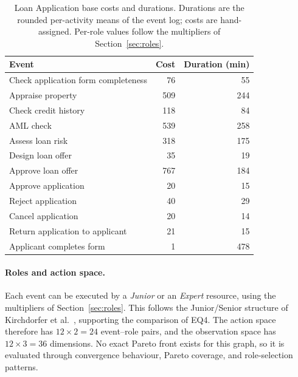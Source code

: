 \begin{table}[H]
\centering
\renewcommand{\arraystretch}{1.5}
\setlength{\tabcolsep}{16pt}
\caption{Loan Application base costs and durations. Durations are the
         rounded per-activity means of the event log; costs are
         hand-assigned. Per-role values follow the multipliers of
         Section~\ref{sec:roles}.}
\label{tab:loan_costs}
\begin{tabular}{lrr}
\toprule
\textbf{Event} & \textbf{Cost} & \textbf{Duration (min)} \\
\midrule
Check application form completeness &  76  &  55  \\
Appraise property                   & 509  & 244  \\
Check credit history                & 118  &  84  \\
AML check                           & 539  & 258  \\
Assess loan risk                    & 318  & 175  \\
Design loan offer                   &  35  &  19  \\
Approve loan offer                  & 767  & 184  \\
Approve application                 &  20  &  15  \\
Reject application                  &  40  &  29  \\
Cancel application                  &  20  &  14  \\
Return application to applicant     &  21  &  15  \\
Applicant completes form            &   1  & 478  \\
\bottomrule
\end{tabular}
\end{table}

\paragraph{Roles and action space.}
Each event can be executed by a \emph{Junior} or an \emph{Expert}
resource, using the multipliers of Section~\ref{sec:roles}. This
follows the Junior/Senior structure of Kirchdorfer et
al.~\cite{KirchdorferLukasFromPolicies}, supporting the comparison of
EQ4. The action space therefore has $12 \times 2 = 24$ event--role
pairs, and the observation space has $12 \times 3 = 36$ dimensions. No
exact Pareto front exists for this graph, so it is evaluated through
convergence behaviour, Pareto coverage, and role-selection patterns.

